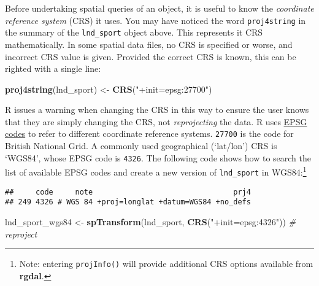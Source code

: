 \documentclass[]{article}
\newenvironment{Shaded}{}{}
\newcommand{\KeywordTok}[1]{\textcolor[rgb]{0.00,0.44,0.13}{\textbf{{#1}}}}
\newcommand{\StringTok}[1]{\textcolor[rgb]{0.25,0.44,0.63}{{#1}}}
\newcommand{\CommentTok}[1]{\textcolor[rgb]{0.38,0.63,0.69}{\textit{{#1}}}}
\newcommand{\NormalTok}[1]{{#1}}
\begin{document}
Before undertaking spatial queries of an object, it is useful to know
the \emph{coordinate reference system} (CRS) it uses. You may have
noticed the word \texttt{proj4string} in the summary of the
\texttt{lnd\_sport} object above. This represents it CRS mathematically.
In some spatial data files, no CRS is specified or worse, and incorrect
CRS value is given. Provided the correct CRS is known, this can be
righted with a single line:

\begin{Shaded}
\begin{Highlighting}[]
\KeywordTok{proj4string}\NormalTok{(lnd_sport) <-}\StringTok{ }\KeywordTok{CRS}\NormalTok{(}\StringTok{"+init=epsg:27700"}\NormalTok{)}
\end{Highlighting}
\end{Shaded}

R issues a warning when changing the CRS in this way to ensure the user
knows that they are simply changing the CRS, not \emph{reprojecting} the
data. R uses \href{}{EPSG codes} to refer to different coordinate
reference systems. \texttt{27700} is the code for British National Grid.
A commonly used geographical (`lat/lon') CRS is `WGS84', whose EPSG code
is \texttt{4326}. The following code shows how to search the list of
available EPSG codes and create a new version of \texttt{lnd\_sport} in
WGS84:\footnote{Note: entering \texttt{projInfo()} will provide
  additional CRS options available from \textbf{rgdal}.}

\begin{Shaded}
\end{Shaded}

\begin{verbatim}
##     code     note                                prj4
## 249 4326 # WGS 84 +proj=longlat +datum=WGS84 +no_defs
\end{verbatim}

\begin{Shaded}
\begin{Highlighting}[]
\NormalTok{lnd_sport_wgs84 <-}\StringTok{ }\KeywordTok{spTransform}\NormalTok{(lnd_sport, }\KeywordTok{CRS}\NormalTok{(}\StringTok{"+init=epsg:4326"}\NormalTok{)) }\CommentTok{# reproject}
\end{Highlighting}
\end{Shaded}
\end{document}
